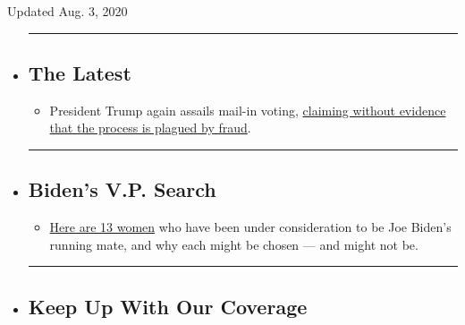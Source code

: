 Updated Aug. 3, 2020

\begin{itemize}
\item
  \begin{center}\rule{0.5\linewidth}{\linethickness}\end{center}

  \hypertarget{the-latest}{%
  \subsection{The Latest}\label{the-latest}}

  \begin{itemize}
  \tightlist
  \item
    President Trump again assails mail-in voting,
    \href{https://www.nytimes3xbfgragh.onion/2020/08/03/us/politics/trump-mail-in-voting.html?action=click\&pgtype=Article\&state=default\&region=BELOW_MAIN_CONTENT\&context=storylines_guide}{claiming
    without evidence that the process is plagued by fraud}.
  \end{itemize}
\item
  \begin{center}\rule{0.5\linewidth}{\linethickness}\end{center}

  \hypertarget{bidens-vp-search}{%
  \subsection{Biden's V.P. Search}\label{bidens-vp-search}}

  \begin{itemize}
  \tightlist
  \item
    \href{https://www.nytimes3xbfgragh.onion/article/biden-vice-president-2020.html?action=click\&pgtype=Article\&state=default\&region=BELOW_MAIN_CONTENT\&context=storylines_guide}{Here
    are 13 women} who have been under consideration to be Joe Biden's
    running mate, and why each might be chosen --- and might not be.
  \end{itemize}
\item
  \begin{center}\rule{0.5\linewidth}{\linethickness}\end{center}

  \hypertarget{keep-up-with-our-coverage}{%
  \subsection{Keep Up With Our
  Coverage}\label{keep-up-with-our-coverage}}


\end{itemize}
